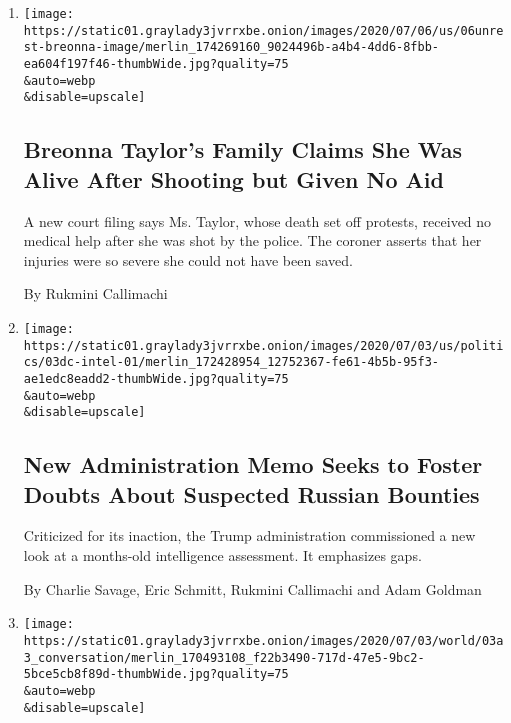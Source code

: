 \begin{enumerate}
\def\labelenumi{\arabic{enumi}.}
\item
  \href{/2020/07/06/us/breonna-taylor-lawsuit-claims.html}{}

  \texttt{[image: https://static01.graylady3jvrrxbe.onion/images/2020/07/06/us/06unrest-breonna-image/merlin\_174269160\_9024496b-a4b4-4dd6-8fbb-ea604f197f46-thumbWide.jpg?quality=75\\\&auto=webp\\\&disable=upscale]}

  \hypertarget{breonna-taylors-family-claims-she-was-alive-after-shooting-but-given-no-aid}{%
  \subsection{Breonna Taylor's Family Claims She Was Alive After
  Shooting but Given No
  Aid}\label{breonna-taylors-family-claims-she-was-alive-after-shooting-but-given-no-aid}}

  A new court filing says Ms. Taylor, whose death set off protests,
  received no medical help after she was shot by the police. The coroner
  asserts that her injuries were so severe she could not have been
  saved.

  By Rukmini Callimachi
\item
  \href{/2020/07/03/us/politics/memo-russian-bounties.html}{}

  \texttt{[image: https://static01.graylady3jvrrxbe.onion/images/2020/07/03/us/politics/03dc-intel-01/merlin\_172428954\_12752367-fe61-4b5b-95f3-ae1edc8eadd2-thumbWide.jpg?quality=75\\\&auto=webp\\\&disable=upscale]}

  \hypertarget{new-administration-memo-seeks-to-foster-doubts-about-suspected-russian-bounties}{%
  \subsection{New Administration Memo Seeks to Foster Doubts About
  Suspected Russian
  Bounties}\label{new-administration-memo-seeks-to-foster-doubts-about-suspected-russian-bounties}}

  Criticized for its inaction, the Trump administration commissioned a
  new look at a months-old intelligence assessment. It emphasizes gaps.

  By Charlie Savage, Eric Schmitt, Rukmini Callimachi and Adam Goldman
\item
  \href{/2020/07/01/world/asia/afghan-russia-bounty-middleman.html}{}

  \texttt{[image: https://static01.graylady3jvrrxbe.onion/images/2020/07/03/world/03a3\_conversation/merlin\_170493108\_f22b3490-717d-47e5-9bc2-5bce5cb8f89d-thumbWide.jpg?quality=75\\\&auto=webp\\\&disable=upscale]}


\end{enumerate}
